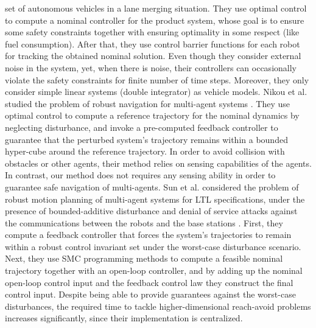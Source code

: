 \begin{enumerate}[(1)]
set of autonomous vehicles in a lane merging situation.
They use optimal control to compute a nominal controller for the product system, 
whose goal is to ensure some safety constraints together with ensuring optimality in some respect (like fuel consumption).
After that, they use control barrier functions for each robot for tracking the obtained nominal solution.
Even though they consider external noise in the system, yet, when there is noise, their controllers can 
occasionally violate the safety constraints for finite number of time steps.
Moreover, they only consider simple linear systems (double integrator) as vehicle models. 
Nikou et al. studied the problem of robust navigation for multi-agent systems \cite{Nikou2019}. 
They use optimal control to compute a reference trajectory for the nominal dynamics by neglecting disturbance, and invoke a  pre-computed feedback controller to guarantee that the perturbed system's trajectory remains within a bounded hyper-cube around the reference trajectory. In order to avoid collision with obstacles or other agents, their method relies on sensing capabilities of the agents. In contrast, our method does not requires any sensing ability in order to guarantee safe navigation of multi-agents. Sun et al. considered the problem of robust motion planning of multi-agent systems for LTL specifications, under the presence of bounded-additive disturbance and denial of service attacks against the communications between the robots and the base stations \cite{sun2019}. First, they compute a feedback controller that forces the system's trajectories to remain within a robust control invariant set under the worst-case disturbance scenario. 
Next, they use SMC programming methods to compute a feasible nominal trajectory together with an open-loop controller, and by adding up the nominal
open-loop control input and the feedback control law they construct the final control input. Despite being able to provide guarantees against the worst-case disturbances, the required time to tackle higher-dimensional reach-avoid problems increases significantly, since their implementation is centralized.%


\end{enumerate}

